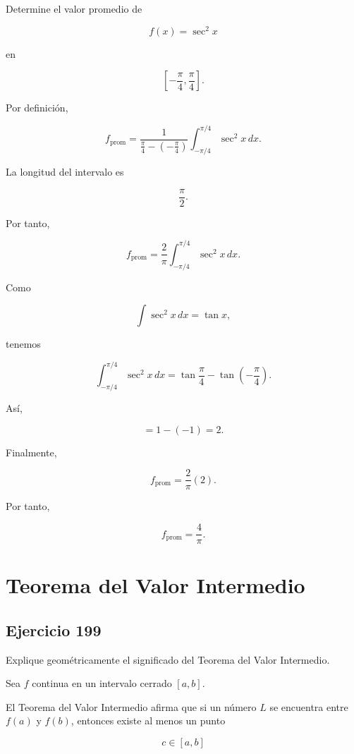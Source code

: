 \documentclass[12pt]{article}
\begin{document}
Determine el valor promedio de

\[
f(x)=\sec^2x
\]

en

\[
\left[-\frac{\pi}{4},\frac{\pi}{4}\right].
\]

Por definición,

\[
f_{\mathrm{prom}}
=
\frac{1}{
\frac{\pi}{4}-\left(-\frac{\pi}{4}\right)
}
\int_{-\pi/4}^{\pi/4}\sec^2x\,dx.
\]

La longitud del intervalo es

\[
\frac{\pi}{2}.
\]

Por tanto,

\[
f_{\mathrm{prom}}
=
\frac{2}{\pi}
\int_{-\pi/4}^{\pi/4}\sec^2x\,dx.
\]

Como

\[
\int\sec^2x\,dx=\tan x,
\]

tenemos

\[
\int_{-\pi/4}^{\pi/4}\sec^2x\,dx
=
\tan\frac{\pi}{4}
-
\tan\left(-\frac{\pi}{4}\right).
\]

Así,

\[
=1-(-1)=2.
\]

Finalmente,

\[
f_{\mathrm{prom}}
=
\frac2\pi(2).
\]

Por tanto,

\[
\boxed{
f_{\mathrm{prom}}=\frac4\pi
}.
\]

\section*{Teorema del Valor Intermedio}

\subsection*{Ejercicio 199}

Explique geométricamente el significado del Teorema del Valor
Intermedio.

Sea \(f\) continua en un intervalo cerrado \([a,b]\).

El Teorema del Valor Intermedio afirma que si un número \(L\) se
encuentra entre \(f(a)\) y \(f(b)\), entonces existe al menos un punto

\[
c\in[a,b]
\]
\end{document}
